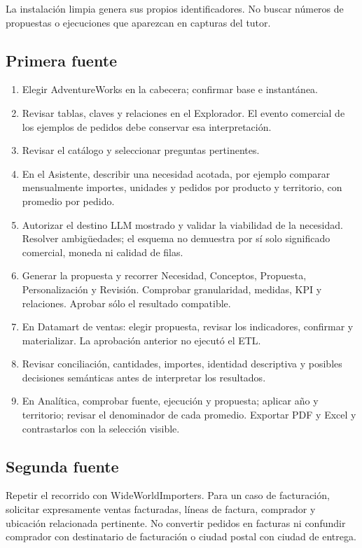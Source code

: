 \documentclass[
  spanish,
  10pt,
  a4paper,
]{article}
\providecommand{\tightlist}{%
  \setlength{\itemsep}{0pt}\setlength{\parskip}{0pt}}
\begin{document}
La instalación limpia genera sus propios identificadores. No buscar
números de propuestas o ejecuciones que aparezcan en capturas del tutor.

\subsection{Primera fuente}\label{primera-fuente}

\begin{enumerate}
\def\labelenumi{\arabic{enumi}.}
\tightlist
\item
  Elegir AdventureWorks en la cabecera; confirmar base e instantánea.
\item
  Revisar tablas, claves y relaciones en el Explorador. El evento
  comercial de los ejemplos de pedidos debe conservar esa
  interpretación.
\item
  Revisar el catálogo y seleccionar preguntas pertinentes.
\item
  En el Asistente, describir una necesidad acotada, por ejemplo comparar
  mensualmente importes, unidades y pedidos por producto y territorio,
  con promedio por pedido.
\item
  Autorizar el destino LLM mostrado y validar la viabilidad de la
  necesidad. Resolver ambigüedades; el esquema no demuestra por sí solo
  significado comercial, moneda ni calidad de filas.
\item
  Generar la propuesta y recorrer Necesidad, Conceptos, Propuesta,
  Personalización y Revisión. Comprobar granularidad, medidas, KPI y
  relaciones. Aprobar sólo el resultado compatible.
\item
  En Datamart de ventas: elegir propuesta, revisar los indicadores,
  confirmar y materializar. La aprobación anterior no ejecutó el ETL.
\item
  Revisar conciliación, cantidades, importes, identidad descriptiva y
  posibles decisiones semánticas antes de interpretar los resultados.
\item
  En Analítica, comprobar fuente, ejecución y propuesta; aplicar año y
  territorio; revisar el denominador de cada promedio. Exportar PDF y
  Excel y contrastarlos con la selección visible.
\end{enumerate}

\subsection{Segunda fuente}\label{segunda-fuente}

Repetir el recorrido con WideWorldImporters. Para un caso de
facturación, solicitar expresamente ventas facturadas, líneas de
factura, comprador y ubicación relacionada pertinente. No convertir
pedidos en facturas ni confundir comprador con destinatario de
facturación o ciudad postal con ciudad de entrega.
\end{document}
